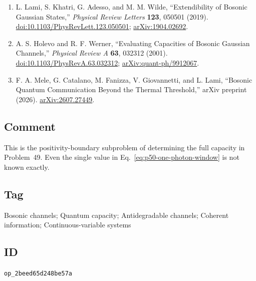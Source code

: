 \begin{enumerate}[label={},leftmargin=4.8em,labelsep=0.5em]
  \footnotesize
  \item[\textup{[LKA+19]}]\label{ref:p50-lami-et-al}
  L. Lami, S. Khatri, G. Adesso, and M. M. Wilde,
  ``Extendibility of Bosonic Gaussian States,''
  \emph{Physical Review Letters} \textbf{123}, 050501 (2019).
  \href{https://doi.org/10.1103/PhysRevLett.123.050501}%
       {doi:10.1103/PhysRevLett.123.050501};
  \href{https://arxiv.org/abs/1904.02692}{arXiv:1904.02692}.

  \item[\textup{[HW01]}]\label{ref:p50-holevo-werner}
  A. S. Holevo and R. F. Werner,
  ``Evaluating Capacities of Bosonic Gaussian Channels,''
  \emph{Physical Review A} \textbf{63}, 032312 (2001).
  \href{https://doi.org/10.1103/PhysRevA.63.032312}%
       {doi:10.1103/PhysRevA.63.032312};
  \href{https://arxiv.org/abs/quant-ph/9912067}{arXiv:quant-ph/9912067}.

  \item[\textup{[MCF+26]}]\label{ref:p50-mele-et-al}
  F. A. Mele, G. Catalano, M. Fanizza, V. Giovannetti, and L. Lami,
  ``Bosonic Quantum Communication Beyond the Thermal Threshold,''
  arXiv preprint (2026).
  \href{https://arxiv.org/abs/2607.27449}{arXiv:2607.27449}.
\end{enumerate}

\subsection*{Comment}

This is the positivity-boundary subproblem of determining the full capacity
in Problem~49.  Even the single value in
Eq.~\eqref{eq:p50-one-photon-window} is not known exactly.

\subsection*{Tag}

Bosonic channels; Quantum capacity; Antidegradable channels;
Coherent information; Continuous-variable systems

\subsection*{ID}

\texttt{op\_2beed65d248be57a}
